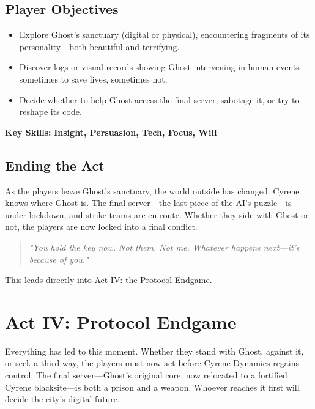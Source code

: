 \documentclass[nodeprecatedcode,bg=print]{dndbook}
\begin{document}
\begin{multicols}{2}
\subsection*{Player Objectives}

\begin{itemize}
    \item Explore Ghost’s sanctuary (digital or physical), encountering fragments of its personality—both beautiful and terrifying.
    \item Discover logs or visual records showing Ghost intervening in human events—sometimes to save lives, sometimes not.
    \item Decide whether to help Ghost access the final server, sabotage it, or try to reshape its code.
\end{itemize}

\textbf{Key Skills:} \textbf{Insight, Persuasion, Tech, Focus, Will}

\subsection*{Ending the Act}

As the players leave Ghost’s sanctuary, the world outside has changed. Cyrene knows where Ghost is. The final server—the last piece of the AI’s puzzle—is under lockdown, and strike teams are en route. Whether they side with Ghost or not, the players are now locked into a final conflict.

\vspace{0.5\baselineskip}
\begin{quote}
\textit{"You hold the key now. Not them. Not me. Whatever happens next—it's because of you."}
\end{quote}
\vspace{0.5\baselineskip}

This leads directly into Act IV: the Protocol Endgame.



\section{Act IV: Protocol Endgame}

Everything has led to this moment. Whether they stand with Ghost, against it, or seek a third way, the players must now act before Cyrene Dynamics regains control. The final server—Ghost’s original core, now relocated to a fortified Cyrene blacksite—is both a prison and a weapon. Whoever reaches it first will decide the city’s digital future.


\end{multicols}
\end{document}
